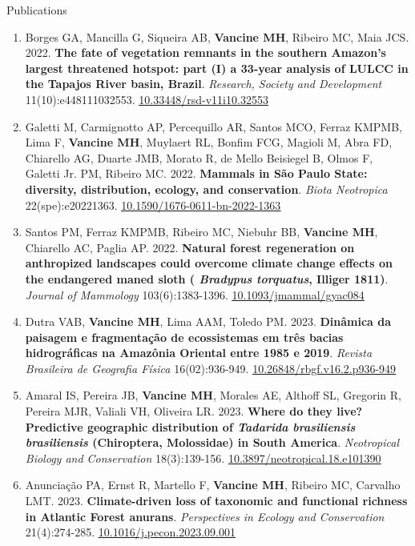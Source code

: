 \documentclass{resume}
\begin{document}
\begin{rSection}{Publications}
\begin{enumerate}
\item Borges GA, Mancilla G, Siqueira AB, {\bf Vancine MH}, Ribeiro MC, Maia JCS. 2022. {\bf The fate of vegetation remnants in the southern Amazon’s largest threatened hotspot: part (I) a 33-year analysis of LULCC in the Tapajos River basin, Brazil}. {\it Research, Society and Development} 11(10):e448111032553. \href{https://doi.org/10.33448/rsd-v11i10.32553}{\underline{10.33448/rsd-v11i10.32553}}

\item Galetti M, Carmignotto AP, Percequillo AR, Santos MCO, Ferraz KMPMB, Lima F, {\bf Vancine MH}, Muylaert RL, Bonfim FCG, Magioli M, Abra FD, Chiarello AG, Duarte JMB, Morato R, de Mello Beisiegel B, Olmos F, Galetti Jr. PM, Ribeiro MC. 2022. {\bf Mammals in São Paulo State: diversity, distribution, ecology, and conservation}. {\it Biota Neotropica}  22(spe):e20221363. \href{https://doi.org/10.1590/1676-0611-bn-2022-1363}{\underline{10.1590/1676-0611-bn-2022-1363}}

\item Santos PM, Ferraz KMPMB, Ribeiro MC, Niebuhr BB, {\bf Vancine MH}, Chiarello AC, Paglia AP. 2022. {\bf Natural forest regeneration on anthropized landscapes could overcome climate change effects on the endangered maned sloth (\textbf{\textit{ Bradypus torquatus}}, Illiger 1811)}. {\it Journal of Mammology} 103(6):1383-1396. \href{https://doi.org/10.1093/jmammal/gyac084}{\underline{10.1093/jmammal/gyac084}}

\item Dutra VAB, {\bf Vancine MH}, Lima AAM, Toledo PM. 2023. {\bf Dinâmica da paisagem e fragmentação de ecossistemas em três bacias hidrográficas na Amazônia Oriental entre 1985 e 2019}. {\it Revista Brasileira de Geografia Física} 16(02):936-949. \href{https://doi.org/10.26848/rbgf.v16.2.p936-949}{\underline{10.26848/rbgf.v16.2.p936-949}}

\item Amaral IS, Pereira JB, {\bf Vancine MH}, Morales AE, Althoff SL, Gregorin R, Pereira MJR, Valiali VH, Oliveira LR. 2023. {\bf Where do they live? Predictive geographic distribution of \textbf{\textit{Tadarida brasiliensis brasiliensis}} (Chiroptera, Molossidae) in South America}. {\it Neotropical Biology and Conservation} 18(3):139-156. \href{https://doi.org/10.3897/neotropical.18.e101390}{\underline{10.3897/neotropical.18.e101390}}

\item Anunciação PA, Ernst R, Martello F, {\bf Vancine MH}, Ribeiro MC, Carvalho LMT. 2023. {\bf Climate-driven loss of taxonomic and functional richness in Atlantic Forest anurans}. {\it Perspectives in Ecology and Conservation} 21(4):274-285. \href{https://doi.org/10.1016/j.pecon.2023.09.001}{\underline{10.1016/j.pecon.2023.09.001}}


\end{enumerate}
\end{rSection}
\end{document}
